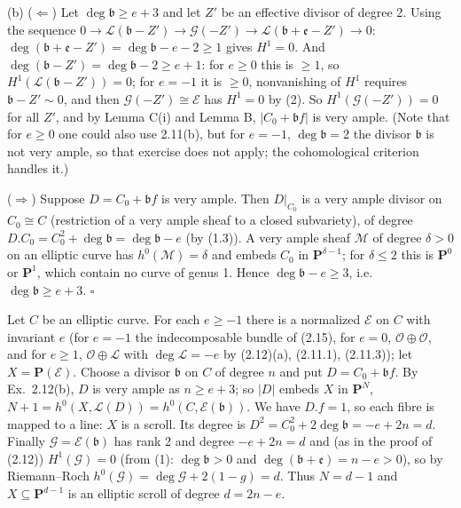 \documentclass[11pt]{article}
\begin{document}
(b) ($\Leftarrow$) Let $\deg\mathfrak b\ge e+3$ and let $Z'$ be an effective divisor of degree 2. Using the sequence $0\to\mathcal L(\mathfrak b-Z')\to\mathcal G(-Z')\to\mathcal L(\mathfrak b+\mathfrak e-Z')\to0$: $\deg(\mathfrak b+\mathfrak e-Z')=\deg\mathfrak b-e-2\ge1$ gives $H^1=0$. And $\deg(\mathfrak b-Z')=\deg\mathfrak b-2\ge e+1$: for $e\ge0$ this is $\ge1$, so $H^1(\mathcal L(\mathfrak b-Z'))=0$; for $e=-1$ it is $\ge0$, nonvanishing of $H^1$ requires $\mathfrak b-Z'\sim0$, and then $\mathcal G(-Z')\cong\mathcal E$ has $H^1=0$ by (2). So $H^1(\mathcal G(-Z'))=0$ for all $Z'$, and by Lemma C(i) and Lemma B, $|C_0+\mathfrak bf|$ is very ample. (Note that for $e\ge0$ one could also use 2.11(b), but for $e=-1$, $\deg\mathfrak b=2$ the divisor $\mathfrak b$ is not very ample, so that exercise does not apply; the cohomological criterion handles it.)

($\Rightarrow$) Suppose $D=C_0+\mathfrak bf$ is very ample. Then $D|_{C_0}$ is a very ample divisor on $C_0\cong C$ (restriction of a very ample sheaf to a closed subvariety), of degree $D.C_0=C_0^2+\deg\mathfrak b=\deg\mathfrak b-e$ (by (1.3)). A very ample sheaf $\mathcal M$ of degree $\delta>0$ on an elliptic curve has $h^0(\mathcal M)=\delta$ and embeds $C_0$ in $\mathbf P^{\delta-1}$; for $\delta\le2$ this is $\mathbf P^0$ or $\mathbf P^1$, which contain no curve of genus 1. Hence $\deg\mathfrak b-e\ge3$, i.e.\ $\deg\mathfrak b\ge e+3$. \hfill$\square$

\pf
Let $C$ be an elliptic curve. For each $e\ge-1$ there is a normalized $\mathcal E$ on $C$ with invariant $e$ (for $e=-1$ the indecomposable bundle of (2.15), for $e=0$, $\mathcal O\oplus\mathcal O$, and for $e\ge1$, $\mathcal O\oplus\mathcal L$ with $\deg\mathcal L=-e$ by (2.12)(a), (2.11.1), (2.11.3)); let $X=\mathbf P(\mathcal E)$. Choose a divisor $\mathfrak b$ on $C$ of degree $n$ and put $D=C_0+\mathfrak bf$. By Ex.~2.12(b), $D$ is very ample as $n\ge e+3$; so $|D|$ embeds $X$ in $\mathbf P^N$, $N+1=h^0(X,\mathcal L(D))=h^0(C,\mathcal E(\mathfrak b))$. We have $D.f=1$, so each fibre is mapped to a line: $X$ is a scroll. Its degree is $D^2=C_0^2+2\deg\mathfrak b=-e+2n=d$. Finally $\mathcal G=\mathcal E(\mathfrak b)$ has rank 2 and degree $-e+2n=d$ and (as in the proof of (2.12)) $H^1(\mathcal G)=0$ (from (1): $\deg\mathfrak b>0$ and $\deg(\mathfrak b+\mathfrak e)=n-e>0$), so by Riemann--Roch $h^0(\mathcal G)=\deg\mathcal G+2(1-g)=d$. Thus $N=d-1$ and $X\subseteq\mathbf P^{d-1}$ is an elliptic scroll of degree $d=2n-e$.
\end{document}
